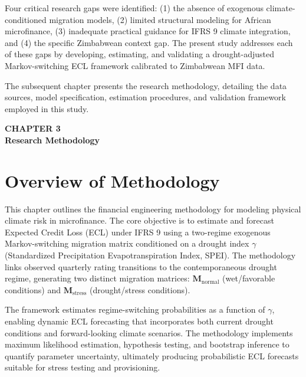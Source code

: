 \documentclass[12pt,a4paper]{article}
\begin{document}
Four critical research gaps were identified: (1) the absence of exogenous climate-conditioned migration models, (2) limited structural modeling for African microfinance, (3) inadequate practical guidance for IFRS 9 climate integration, and (4) the specific Zimbabwean context gap. The present study addresses each of these gaps by developing, estimating, and validating a drought-adjusted Markov-switching ECL framework calibrated to Zimbabwean MFI data.

The subsequent chapter presents the research methodology, detailing the data sources, model specification, estimation procedures, and validation framework employed in this study.

\newpage

\begin{center}
    {\LARGE\bfseries CHAPTER 3}\\[0.5cm]
    {\Large\bfseries Research Methodology}
\end{center}
\setcounter{section}{0}
\renewcommand{\thesection}{3.\arabic{section}}

\vspace{1cm}

\section{Overview of Methodology}

This chapter outlines the financial engineering methodology for modeling physical climate risk in microfinance. The core objective is to estimate and forecast Expected Credit Loss (ECL) under IFRS 9 using a two-regime exogenous Markov-switching migration matrix conditioned on a drought index $\gamma$ (Standardized Precipitation Evapotranspiration Index, SPEI). The methodology links observed quarterly rating transitions to the contemporaneous drought regime, generating two distinct migration matrices: $\mathbf{M}_{\text{normal}}$ (wet/favorable conditions) and $\mathbf{M}_{\text{stress}}$ (drought/stress conditions). 

The framework estimates regime-switching probabilities as a function of $\gamma$, enabling dynamic ECL forecasting that incorporates both current drought conditions and forward-looking climate scenarios. The methodology implements maximum likelihood estimation, hypothesis testing, and bootstrap inference to quantify parameter uncertainty, ultimately producing probabilistic ECL forecasts suitable for stress testing and provisioning.
\end{document}
